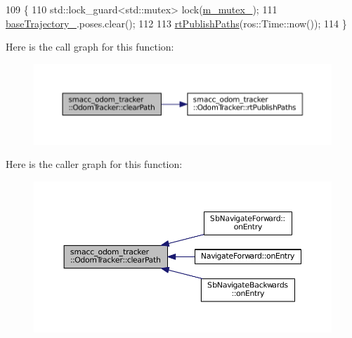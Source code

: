 \begin{DoxyCode}
109 \{
110     std::lock\_guard<std::mutex> lock(\hyperlink{classsmacc__odom__tracker_1_1OdomTracker_ad65e52bfd236e073940808c35f2bed8c}{m\_mutex\_});
111     \hyperlink{classsmacc__odom__tracker_1_1OdomTracker_ac3a17be46ab833632c5f63e75c840dc7}{baseTrajectory\_}.poses.clear();
112 
113     \hyperlink{classsmacc__odom__tracker_1_1OdomTracker_a8c9144a9d8b9ede7f45d06492496564c}{rtPublishPaths}(ros::Time::now());
114 \}
\end{DoxyCode}


Here is the call graph for this function\+:
\nopagebreak
\begin{figure}[H]
\begin{center}
\leavevmode
\includegraphics[width=350pt]{classsmacc__odom__tracker_1_1OdomTracker_a81ef228f0c2659e1bf9f8fdcb03fc7ae_cgraph}
\end{center}
\end{figure}




Here is the caller graph for this function\+:
\nopagebreak
\begin{figure}[H]
\begin{center}
\leavevmode
\includegraphics[width=350pt]{classsmacc__odom__tracker_1_1OdomTracker_a81ef228f0c2659e1bf9f8fdcb03fc7ae_icgraph}
\end{center}
\end{figure}


